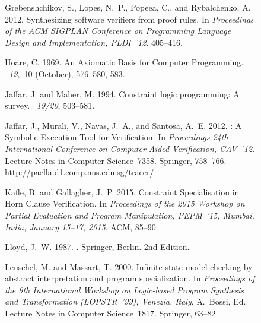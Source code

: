 \documentclass[english]{tlp}
\begin{document}
\begin{figure}[ht]
\begin{flushleft}
\begin{minipage}{124mm}
\begin{thebibliography}{}
{\sc Grebenshchikov, S.}, {\sc Lopes, N.~P.}, {\sc Popeea, C.}, {\sc and} {\sc
  Rybalchenko, A.} 2012.
\newblock Synthesizing software verifiers from proof rules.
\newblock In {\em Proceedings of the ACM SIGPLAN Conference on Programming
  Language Design and Implementation, PLDI~'12}. 405--416.

{\sc Hoare, C.} 1969.
\newblock An {A}xiomatic {B}asis for {C}omputer {P}rogramming.
~{\em 12,\/}~10 (October), 576--580, 583.

{\sc Jaffar, J.} {\sc and} {\sc Maher, M.} 1994.
\newblock Constraint logic programming: {A} survey.
~{\em 19/20}, 503--581.

{\sc Jaffar, J.}, {\sc Murali, V.}, {\sc Navas, J.~A.}, {\sc and} {\sc Santosa,
  A.~E.} 2012.
: {A} {S}ymbolic {E}xecution {T}ool for {V}erification.
\newblock In {\em {P}roceedings 24th {I}nternational {C}onference on {C}omputer
  {A}ided {V}erification, CAV~'12}. Lecture Notes in Computer Science~7358.
  Springer, 758--766.
\newblock \rm {http://paella.d1.comp.nus.edu.sg/tracer/}.

{\sc Kafle, B.} {\sc and} {\sc Gallagher, J.~P.} 2015.
\newblock Constraint {S}pecialisation in {H}orn {C}lause {V}erification.
\newblock In {\em Proceedings of the 2015 Workshop on Partial Evaluation and
  Program Manipulation, PEPM~'15, Mumbai, India, January 15--17, 2015}. {ACM},
  85--90.

{\sc Lloyd, J.~W.} 1987.
.
\newblock Springer, Berlin. 
\newblock 2nd Edition.

{\sc Leuschel, M.} {\sc and} {\sc Massart, T.} 2000.
\newblock Infinite state model checking by abstract interpretation and program
  specialization.
\newblock In {\em Proceedings of the 9th International Workshop on Logic-based
  Program Synthesis and Transformation (LOPSTR~'99), Venezia, Italy},
  {A.~Bossi}, Ed. Lecture Notes in Computer Science~1817. Springer, 63--82.


\end{thebibliography}
\end{minipage}
\end{flushleft}
\end{figure}
\end{document}
